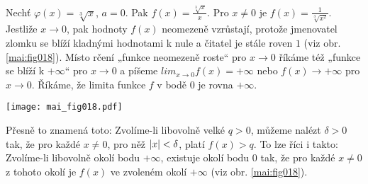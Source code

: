 \wikitextrule
\begin{example}\label{MAI:exam029}
 Nechť \(\varphi(x) = \sqrt[3]{x}\), \(a = 0\). Pak \(f(x) = \frac{\sqrt[3]{x}}{x}\). Pro \(x \neq 
 0\) je \(f(x) = \frac{1}{\sqrt[3]{x^2}}\). Jestliže \(x \to 0\), pak hodnoty \(f(x)\) neomezeně 
 vzrůstají, protože jmenovatel zlomku se blíží kladnými hodnotami k nule a čitatel je stále roven 
 \(1\) (viz obr. \ref{mai:fig018}). Místo rčení „funkce neomezeně roste“ pro \(x \to 0\) říkáme též 
 „funkce se blíží k \(+\infty\)“ pro \(x \to 0\) a píšeme \(lim_{x\to 0} f(x) = +\infty\) nebo 
 \(f(x) \to +\infty\) pro \(x \to 0\). Říkáme, že limita funkce \(f\) v bodě \(0\) je rovna 
 \(+\infty\). 
  
  {\centering
   \captionsetup{type=figure}
%   
   \texttt{[image: mai\_fig018.pdf]}
  \par}
  
  Přesně to znamená toto: Zvolíme-li libovolně velké \(q > 0\), můžeme nalézt \(\delta > 0\) tak, 
  že pro každé \(x \neq 0\), pro něž \(\lvert x\rvert < \delta\), platí \(f(x) > q\). To lze říci i takto: 
  Zvolíme-li libovolně okolí bodu \(+\infty\), existuje okolí bodu \(0\) tak, že pro každé \(x \neq 
  0\) z tohoto okolí je \(f(x)\) ve zvoleném okolí \(+\infty\) (viz obr. \ref{mai:fig018}).
\end{example}















